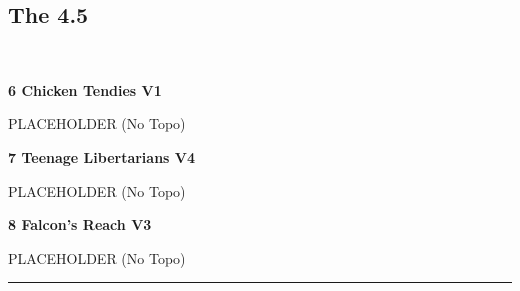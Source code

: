 \begin{multicols}{2}
			\subsection*{The 4.5}\label{bf:The 4.5}
			\begin{minipage}{\columnwidth}
			\
			\end{minipage}
			
					\begin{minipage}{\linewidth}	
					\label{rt:Chicken Tendies}
\colorbox{green!20}{
\textbf{
6 Chicken Tendies V1   
}
}

					\begin{adjustwidth}{0.5cm}{}				
					PLACEHOLDER
						\newline (No Topo) 
					\end{adjustwidth}
					\end{minipage}
					\begin{minipage}{\linewidth}	
					\label{rt:Teenage Libertarians}
\colorbox{RoyalBlue!20}{
\textbf{
7 Teenage Libertarians V4 \ding{72} \ding{72} \ding{72}  
}
}

					\begin{adjustwidth}{0.5cm}{}				
					PLACEHOLDER
						\newline (No Topo) 
					\end{adjustwidth}
					\end{minipage}
					\begin{minipage}{\linewidth}	
					\label{rt:Falcon's Reach}
\colorbox{green!20}{
\textbf{
8 Falcon's Reach V3   
}
}

					\begin{adjustwidth}{0.5cm}{}				
					PLACEHOLDER
						\newline (No Topo) 
					\end{adjustwidth}
					\end{minipage}
\end{multicols}
\rule{\textwidth}{1pt}
